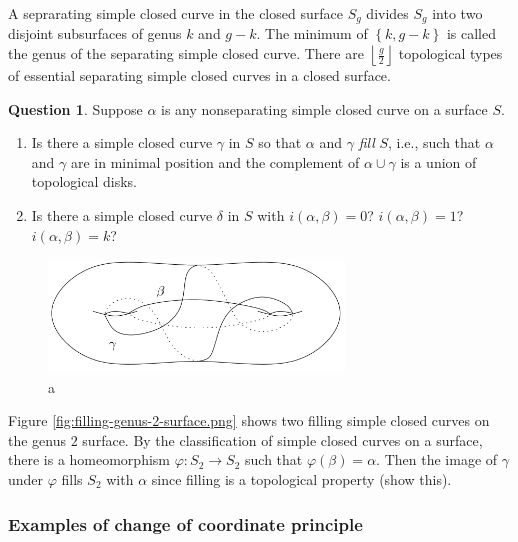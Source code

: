 \documentclass[reqno]{amsart}
\theoremstyle{definition}
\newtheorem{question}[theorem]{Question}
\theoremstyle{remark}
\begin{document}
A seprarating simple closed curve in the closed surface
$S_g$ divides $S_g$ into two disjoint subsurfaces of genus
$k$ and $g-k$. The minimum of $\left\{ k, g-k \right\} $ is
called the genus of the separating simple closed curve. 
There are $\left\lfloor \frac{g}{2} \right\rfloor$ topological
types of essential separating simple closed curves in
a closed surface.

\begin{question}
    Suppose $\alpha$ is any nonseparating simple closed curve
    on a surface $S$.
    \begin{enumerate}
        \item Is there a simple closed curve
            $\gamma$ in $S$ so that $\alpha$ and $\gamma$ 
            \textit{fill} $S$, i.e., such that
            $\alpha$ and $\gamma$ are in minimal position
            and the complement of $\alpha \cup  \gamma$ is
            a union of topological disks.
        \item Is there a simple closed curve $\delta$ in
            $S$ with $i(\alpha,\beta) = 0$? $i(\alpha,\beta)=1$?
            $i(\alpha,\beta)=k$?
    \end{enumerate}
\end{question}

\begin{figure}[htpb]
    \centering
    \includegraphics[width=0.7\textwidth]{filling-genus-2-surface.png}
    \caption{a}
    \label{fig:filling-genus-2-surface-png}
\end{figure}

Figure \ref{fig:filling-genus-2-surface.png} shows
two filling simple closed curves on the genus $2$ surface.
By the classification of simple closed curves on a surface,
there is a homeomorphism $\varphi \colon S_2 \to S_2$ such
that $\varphi\left( \beta \right) =\alpha$. Then
the image of $\gamma$ under $\varphi$ fills $S_2$ with
$\alpha$ since filling is a topological property (show this).

\subsubsection{Examples of change of coordinate principle}
\end{document}
